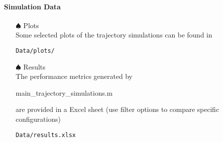 \documentclass[a4paper]{article}
\begin{document}
\paragraph{Simulation Data}
\begin{itemize}

\item[$\spadesuit$] Plots \\
Some selected plots of the trajectory simulations can be found in
\begin{verbatim}
Data/plots/
\end{verbatim}
\item[$\spadesuit$] Results \\
The performance metrics generated by \begin{scriptsize}main\_trajectory\_simulations.m\end{scriptsize} are provided in a Excel sheet (use filter options to compare specific configurations)
\begin{verbatim}
Data/results.xlsx
\end{verbatim}

\end{itemize}
\end{document}
